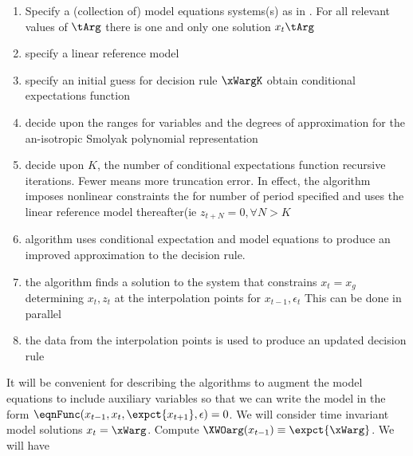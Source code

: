 \documentclass[12pt]{article}
\begin{document}
\begin{enumerate}
\item Specify a (collection of) model equations systems(s) 
as in .
For all relevant values of $\tArg$ there is one and only one solution $x_t\tArg$
\item specify a linear reference model
\item specify an initial guess for decision rule $\xWargK$ obtain conditional expectations function
\item decide upon the ranges for variables and the degrees of approximation for the an-isotropic Smolyak polynomial representation
\item decide upon $K$, the number of conditional expectations function recursive iterations.  Fewer means more truncation error. In effect, 
the algorithm imposes nonlinear constraints the for number of period specified 
and uses the linear reference model thereafter(ie $z_{t+N}=0, \forall N>K$
\item algorithm uses conditional expectation and model equations to produce an improved approximation to the decision rule.
\item the algorithm finds a solution to the system that constrains $x_t= x_g$ determining $x_t,z_t$ at the interpolation points for $x_{t-1},\epsilon_t$  This can be done in parallel
\item the data from the interpolation points is used to produce an updated decision rule
\end{enumerate}



It will be convenient for describing the algorithms to
 augment the model equations to include auxiliary variables so that we can write the model in the form
$  \eqnFunc(x_{t-1},x_t,\expct{x_{t+1}},\epsilon)=0$.  We will consider time invariant model solutions $x_t=\xWarg$.  Compute $\XWOarg(x_{t-1})\equiv \expct{\xWarg}$. We will have
\end{document}
